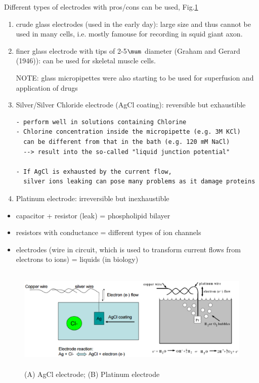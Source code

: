 Different types of electrodes with pros/cons can be used,
Fig.\ref{fig:electrode-AgCl-and-Platinum}
\begin{enumerate}
    \item crude glass electrodes (used in the early day): large size and thus
    cannot be used in many cells, i.e. mostly famouse for recording in
    squid giant axon.

    \item finer glass electrode with tips of 2-5$\mum$ diameter (Graham and
    Gerard (1946)): can be used for skeletal muscle cells.

NOTE: glass micropipettes were also starting to be
used for superfusion and application of drugs

    \item Silver/Silver Chloride electrode (AgCl coating):
     reversible but exhaustible
{\small
\begin{verbatim}
- perform well in solutions containing Chlorine
- Chlorine concentration inside the micropipette (e.g. 3M KCl)
  can be different from that in the bath (e.g. 120 mM NaCl)
  --> result into the so-called "liquid junction potential"

- If AgCl is exhausted by the current flow,
  silver ions leaking can pose many problems as it damage proteins
\end{verbatim}
}
    \item Platinum electrode:  irreversible but inexhaustible
\end{enumerate}

\begin{itemize}
  \item capacitor + resistor (leak) = phospholipid bilayer
  \item resistors with conductance = different types of ion channels
  \item electrodes (wire in circuit, which is used to transform current flows
  from electrons to ions) = liquids (in biology)
\end{itemize}

\begin{figure}[hbt]
  \centerline{\includegraphics[height=5cm,
    angle=0]{./images/electrode-AgCl-and-Platinum.eps}}
\caption{(A) AgCl electrode; (B) Platinum electrode}
\label{fig:electrode-AgCl-and-Platinum}
\end{figure}

